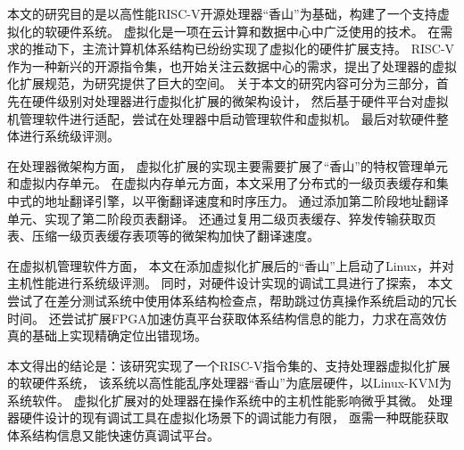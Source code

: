 \begin{cabstract}
本文的研究目的是以高性能RISC-V开源处理器“香山”为基础，构建了一个支持虚拟化的软硬件系统。
虚拟化是一项在云计算和数据中心中广泛使用的技术。
在需求的推动下，主流计算机体系结构已纷纷实现了虚拟化的硬件扩展支持。
RISC-V作为一种新兴的开源指令集，也开始关注云数据中心的需求，提出了处理器的虚拟化扩展规范，为研究提供了巨大的空间。
关于本文的研究内容可分为三部分，首先在硬件级别对处理器进行虚拟化扩展的微架构设计，
然后基于硬件平台对虚拟机管理软件进行适配，尝试在处理器中启动管理软件和虚拟机。
最后对软硬件整体进行系统级评测。

在处理器微架构方面，
虚拟化扩展的实现主要需要扩展了“香山”的特权管理单元和虚拟内存单元。
在虚拟内存单元方面，本文采用了分布式的一级页表缓存和集中式的地址翻译引擎，以平衡翻译速度和时序压力。
通过添加第二阶段地址翻译单元、实现了第二阶段页表翻译。
还通过复用二级页表缓存、猝发传输获取页表、压缩一级页表缓存表项等的微架构加快了翻译速度。

在虚拟机管理软件方面，
本文在添加虚拟化扩展后的“香山”上启动了Linux，并对主机性能进行系统级评测。
同时，对硬件设计实现的调试工具进行了探索，
本文尝试了在差分测试系统中使用体系结构检查点，帮助跳过仿真操作系统启动的冗长时间。
还尝试扩展FPGA加速仿真平台获取体系结构信息的能力，力求在高效仿真的基础上实现精确定位出错现场。

本文得出的结论是：该研究实现了一个RISC-V指令集的、支持处理器虚拟化扩展的软硬件系统，
该系统以高性能乱序处理器“香山”为底层硬件，以Linux-KVM为系统软件。
虚拟化扩展对的处理器在操作系统中的主机性能影响微乎其微。
处理器硬件设计的现有调试工具在虚拟化场景下的调试能力有限，
亟需一种既能获取体系结构信息又能快速仿真调试平台。

\end{cabstract}

